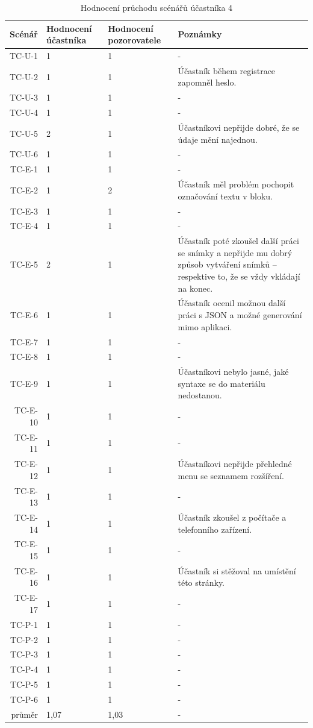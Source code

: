 \begin{longtable}{r|p{2cm}|p{2cm}|p{6cm}}
    \caption{Hodnocení průchodu scénářů účastníka 4}\label{tab:hodnoceniPruchoduUcastnika4}\\
Scénář & Hodnocení účastníka & Hodnocení pozorovatele & Poznámky\\\hline\hline
TC-U-1   & 1 & 1 & - \\\hline
TC-U-2   & 1 & 1 & Účastník během registrace zapomněl heslo. \\\hline
TC-U-3   & 1 & 1 & - \\\hline
TC-U-4   & 1 & 1 & - \\\hline
TC-U-5   & 2 & 1 & Účastníkovi nepřijde dobré, že se údaje mění najednou. \\\hline
TC-U-6   & 1 & 1 & - \\\hline
TC-E-1   & 1 & 1 & - \\\hline
TC-E-2   & 1 & 2 & Účastník měl problém pochopit označování textu v bloku. \\\hline
TC-E-3   & 1 & 1 & - \\\hline
TC-E-4   & 1 & 1 & - \\\hline
TC-E-5   & 2 & 1 & Účastník poté zkoušel další práci se snímky a nepřijde mu dobrý způsob vytváření snímků -- respektive to, že se vždy vkládají na konec. \\\hline
TC-E-6   & 1 & 1 & Účastník ocenil možnou další práci s JSON a možné generování mimo aplikaci. \\\hline
TC-E-7   & 1 & 1 & - \\\hline
TC-E-8   & 1 & 1 & - \\\hline
TC-E-9   & 1 & 1 & Účastníkovi nebylo jasné, jaké syntaxe se do materiálu nedostanou. \\\hline
TC-E-10  & 1 & 1 & - \\\hline
TC-E-11  & 1 & 1 & - \\\hline
TC-E-12  & 1 & 1 & Účastníkovi nepřijde přehledné menu se seznamem rozšíření. \\\hline
TC-E-13  & 1 & 1 & - \\\hline
TC-E-14  & 1 & 1 & Účastník zkoušel z počítače a telefonního zařízení. \\\hline
TC-E-15  & 1 & 1 & - \\\hline
TC-E-16  & 1 & 1 & Účastník si stěžoval na umístění této stránky. \\\hline
TC-E-17  & 1 & 1 & - \\\hline
TC-P-1   & 1 & 1 & - \\\hline
TC-P-2   & 1 & 1 & - \\\hline
TC-P-3   & 1 & 1 & - \\\hline
TC-P-4   & 1 & 1 & - \\\hline
TC-P-5   & 1 & 1 & - \\\hline
TC-P-6   & 1 & 1 & - \\\hline\hline
průměr   & 1,07 & 1,03 & - \\
\end{longtable}

